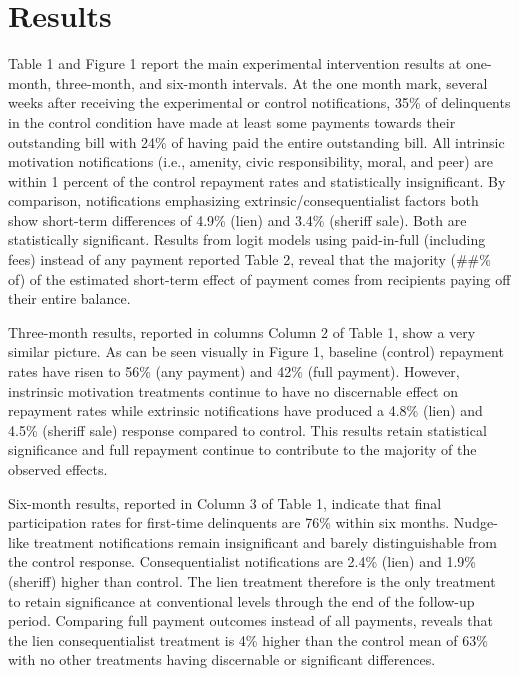 \documentclass[12pt,titlepage]{article}
\begin{document}
\section{Results}

Table 1 and Figure 1 report the main experimental intervention results 
at one-month, three-month, and six-month intervals. At the one month mark, 
several weeks after receiving the experimental or control notifications, 
35\% of delinquents in the control condition have made at least some payments 
towards their outstanding bill with 24\% of having paid the entire outstanding 
bill. All intrinsic motivation notifications (i.e., amenity, civic responsibility, 
moral, and peer) are within 1 percent of the control repayment rates and 
statistically insignificant. By comparison, notifications emphasizing 
extrinsic/consequentialist factors both show short-term differences of 
4.9\% (lien) and 3.4\% (sheriff sale). Both are statistically significant. 
Results from logit models using paid-in-full (including fees) instead of any 
payment reported Table 2, reveal that the majority (\#\#\% of) of the estimated 
short-term effect of payment comes from recipients paying off their entire balance.

Three-month results, reported in columns Column 2 of Table 1, show a very 
similar picture. As can be seen visually in Figure 1, baseline (control) 
repayment rates have risen to 56\% (any payment) and 42\% (full payment). 
However, instrinsic motivation treatments continue to have no discernable 
effect on repayment rates while extrinsic notifications have produced a 
4.8\% (lien) and 4.5\% (sheriff sale) response compared to control. This 
results retain statistical significance and full repayment continue to 
contribute to the majority of the observed effects.

Six-month results, reported in Column 3 of Table 1, indicate that final 
participation rates for first-time delinquents are 76\% within six months. 
Nudge-like treatment notifications remain insignificant and barely 
distinguishable from the control response. Consequentialist notifications 
are 2.4\% (lien) and 1.9\% (sheriff) higher than control. The lien treatment 
therefore is the only treatment to retain significance at conventional 
levels through the end of the follow-up period. Comparing full payment 
outcomes instead of all payments, reveals that the lien consequentialist 
treatment is 4\% higher than the control mean of 63\% with no other 
treatments having discernable or significant differences.
\end{document}
